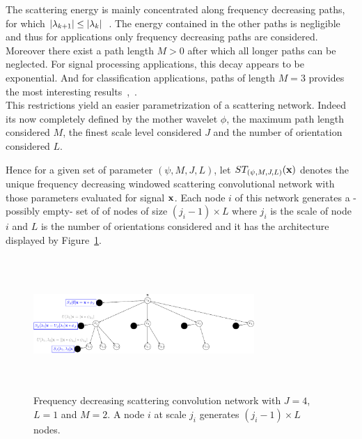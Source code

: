\documentclass{article}
\begin{document}
    The scattering energy is mainly concentrated along frequency decreasing paths, \ie for which $\left| \lambda_{k+1} \right| \leq \left| \lambda_{k} \right|$~\citep{mallat gis}. The energy contained in the other paths is negligible and thus for applications only frequency decreasing paths are considered. Moreover there exist a path length $M > 0$ after which all longer paths can be neglected. For signal processing applications, this decay appears to be exponential. And for classification applications, paths of length $M = 3$ provides the most interesting results~\citep{anden2011multiscale},~\citep{bruna2010classification}.\\
      
    This restrictions yield an easier parametrization of a scattering network. Indeed its now completely defined by the mother wavelet $\phi$, the maximum path length considered $M$, the finest scale level considered $J$ and the number of orientation considered $L$.
      
    Hence for a given set of parameter $(\psi, M,J,L)$, let $ST_{(\psi, M,J,L)}({\bf x})$ denotes the unique frequency decreasing windowed scattering convolutional network with those parameters evaluated for signal ${\bf x}$. Each node $i$ of this network generates a -possibly empty- set of of nodes of size $(j_{i}-1) \times L$ where $j_{i}$ is the scale of node $i$ and $L$ is the number of orientations considered and it has the architecture displayed by Figure~\ref{fig:SCN 2}.

    \begin{figure}
      \begin{center}
        \includegraphics[width=3.3in, height=2in, keepaspectratio]{ST_freqDec_crop.pdf}
        \caption[Frequency decreasing scattering convolution network.]{\centering  Frequency decreasing scattering convolution network with $J=4$, $L=1$ and $M=2$. A node $i$ at scale $j_{i}$ generates $(j_{i}-1) \times L$ nodes. }
        \label{fig:SCN 2}
      \end{center}
      \vspace{-15pt}
    \end{figure}
\end{document}
